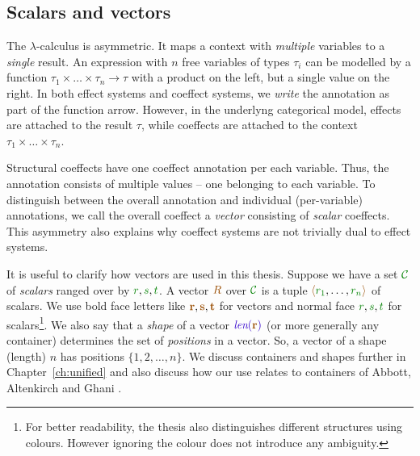
\subsection{Scalars and vectors}
\label{sec:applications-strucutre-vec}

The $\lambda$-calculus is asymmetric. It maps a context with \emph{multiple} variables to a 
\emph{single} result. An expression with $n$ free variables of types $\tau_i$ can be modelled by a function 
$\tau_1 \times \ldots \times \tau_n \rightarrow \tau$ with a product on the left, but a single value
on the right. In both effect systems and coeffect systems, we \emph{write} the annotation as part of
the function arrow. However, in the underlyng categorical model, effects are attached to the result
$\tau$, while coeffects are attached to the context $\tau_1 \times \ldots \times \tau_n$.

Structural coeffects have one coeffect annotation per each variable. Thus, the annotation consists
of multiple values -- one belonging to each variable. To distinguish between the overall annotation
and individual (per-variable) annotations, we call the overall coeffect a \emph{vector} consisting of 
\emph{scalar} coeffects. This asymmetry also explains why coeffect systems are not trivially dual to 
effect systems.

It is useful to clarify how vectors are used in this thesis. Suppose we have a set $\C$ of
\emph{scalars} ranged over by $\cclrd{r},\cclrd{s},\cclrd{t}$. A vector $\aclrd{R}$ 
over $\C$ is a tuple $\alift{ \cclrd{r_1}, \ldots, \cclrd{r_n} }$ of scalars. 
We use bold face letters like $\aclrd{\textbf{r}}, \aclrd{\textbf{s}}, \aclrd{\textbf{t}}$ for vectors and 
normal face $\cclrd{r},\cclrd{s},\cclrd{t}$ for scalars\footnote{For better readability, the thesis
also distinguishes different structures using colours. However ignoring the colour does not introduce 
any ambiguity.}. We also say that a \emph{shape} of a vector $\slen{\aclrd{\textbf{r}}}$ (or more generally any container) 
determines the set of \emph{positions} in a vector. So, a vector of a shape (length) $n$ has positions 
$\{ 1, 2, \ldots, n \}$. We discuss containers and shapes further in Chapter~\ref{ch:unified} and also 
discuss how our use relates to containers of Abbott, Altenkirch and Ghani \cite{types-containers}.

